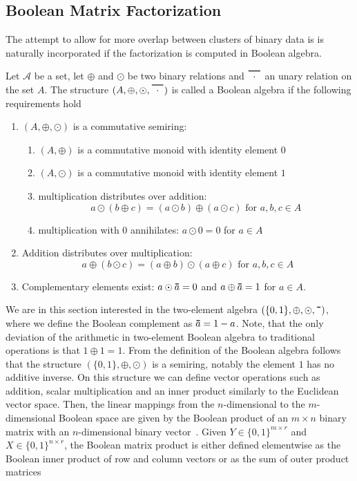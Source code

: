 \subsection{Boolean Matrix Factorization}\label{sec:ZS:BooleanMF}
The attempt to allow for more overlap between clusters of binary data is  is naturally incorporated if the factorization is computed in Boolean algebra. 
\begin{definition}\label{def:BoolAlgebra}
Let $\mathcal{A}$ be a set, let $\oplus$ and $\odot$ be two binary relations and $\thickbar{\phantom{l}\cdot\phantom{l}}$ an unary relation on the set $A$. The structure $(A,\oplus,\odot,\thickbar{\phantom{l}\cdot\phantom{l}})$ is called a Boolean algebra if the following requirements hold
\begin{enumerate}
    \item $(A,\oplus,\odot)$ is a commutative semiring:
    \begin{enumerate}
        \item $(A,\oplus)$ is a commutative monoid with identity element $0$
        \item $(A,\odot)$ is a commutative monoid with identity element $1$
        \item multiplication distributes over addition:
        \begin{equation*}
            a\odot(b\oplus c) = (a\odot b)\oplus (a\odot c) \text{ for } a,b,c\in A
        \end{equation*}
        \item multiplication with $0$ annihilates: $a\odot 0=0$ for $a\in A$
    \end{enumerate}
    \item Addition distributes over multiplication:
    \begin{equation*}
        a\oplus(b\odot c) = (a\oplus b)\odot (a\oplus c) \text{ for } a,b,c\in A
    \end{equation*}
    \item Complementary elements exist: $a\odot \thickbar{a}=0$ and $a\oplus \thickbar{a}=1$ for $a\in A$.
\end{enumerate}
\end{definition}
We are in this section interested in the two-element algebra $(\{0,1\},\oplus,\odot,\thickbar{\phantom{a}})$, where we define the Boolean complement as $\thickbar{a}=1-a$. Note, that the only deviation of the arithmetic in two-element Boolean algebra to traditional operations is that $1\oplus 1=1$. From the definition of the Boolean algebra follows that the structure $(\{0,1\},\oplus,\odot)$ is a semiring, notably the element $1$ has no additive inverse. On this structure we can define vector operations such as addition, scalar multiplication and an inner product similarly to the Euclidean vector space. Then, the linear mappings from the $n$-dimensional to the $m$-dimensional Boolean space are given by the Boolean product of an $m\times n$ binary matrix with an $n$-dimensional binary vector~\citep{gudder2009boolean}. Given $Y\in\{0,1\}^{m\times r}$ and $X\in\{0,1\}^{n\times r}$, the Boolean matrix product is either defined elementwise as the Boolean inner product of row and column vectors or as the sum of outer product matrices
